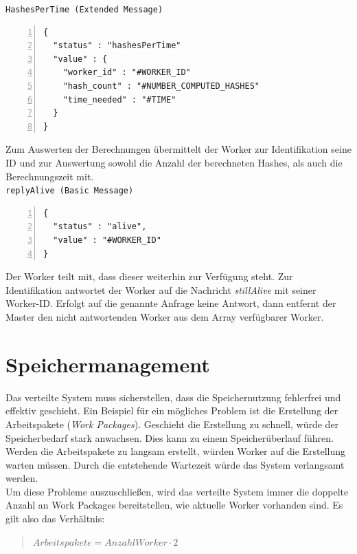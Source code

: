 \texttt{HashesPerTime (Extended Message)}
\begin{lstlisting}[basicstyle=\ttfamily,numbers=left,numberstyle=\footnotesize\ttfamily,backgroundcolor=\color{sourcegray}]
{
  "status" : "hashesPerTime"
  "value" : {
    "worker_id" : "#WORKER_ID"
    "hash_count" : "#NUMBER_COMPUTED_HASHES"
    "time_needed" : "#TIME"
  }
}
\end{lstlisting}
Zum Auswerten der Berechnungen übermittelt der Worker zur Identifikation seine ID und zur Auswertung sowohl die Anzahl der berechneten Hashes, als auch die Berechnungszeit mit. \\

\texttt{replyAlive (Basic Message)}
\begin{lstlisting}[basicstyle=\ttfamily,numbers=left,numberstyle=\footnotesize\ttfamily,backgroundcolor=\color{sourcegray}]
{
  "status" : "alive",
  "value" : "#WORKER_ID"
}
\end{lstlisting}
Der Worker teilt mit, dass dieser weiterhin zur Verfügung steht. Zur Identifikation antwortet der Worker auf die Nachricht 
\emph{stillAlive} mit seiner Worker-ID. Erfolgt auf die genannte Anfrage keine Antwort, dann entfernt der Master den nicht antwortenden Worker aus dem Array verfügbarer Worker.\\



\section{Speichermanagement}
Das verteilte System muss sicherstellen, dass die Speichernutzung fehlerfrei und effektiv geschieht. Ein Beispiel für ein mögliches Problem ist die Erstellung der Arbeitspakete (\emph{Work Packages}). Geschieht die Erstellung zu schnell, würde der Speicherbedarf stark anwachsen. Dies kann zu einem Speicherüberlauf führen. Werden die Arbeitspakete zu langsam erstellt, würden Worker auf die Erstellung warten müssen. Durch die entstehende Wartezeit würde das System verlangsamt werden. \\
Um diese Probleme auszuschließen, wird das verteilte System immer die doppelte Anzahl an Work Packages bereitstellen, wie aktuelle Worker vorhanden sind. Es gilt also das Verhältnis:

\begin{quotation}
\begin{math}
Arbeitspakete = Anzahl Worker \cdot 2 \end{math}
\end{quotation}


